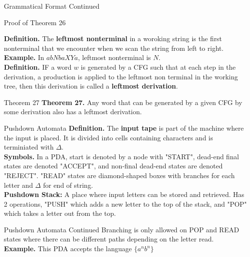 \documentclass{article}
\begin{document}
\begin{multicols*}{3}
\begin{blackbox}{Grammatical Format Continued}
\begin{bluebox}{Proof of Theorem 26}
\begin{itemize}[leftmargin=5pt]
        \end{itemize}
    \end{bluebox}
    \textbf{Definition.} The \textbf{leftmost nonterminal} in a woroking string is the first nonterminal that we encounter when we scan the string from left to right.\\
    \textbf{Example.} In $abNbaXYa$, leftmost nonterminal is $N$. \\
    \textbf{Definition.} IF a word $w$ is generated by a CFG such that at each step in the derivation, a production is applied to the leftmost non terminal in the working tree, then this derivation is called a \textbf{leftmost derivation}.\\
    \begin{redbox}{Theorem 27}
        \textbf{Theorem 27.} Any word that can be generated by a given CFG by some derivation also has a leftmost derivation.
    \end{redbox}

\end{blackbox}
\begin{blackbox}{Pushdown Automata}
    \textbf{Definition.} The \textbf{input tape} is part of the machine where the input is placed. It is divided into cells containing characters and is terminiated with $\Delta$.\\[1ex]
    \textbf{Symbols.} In a PDA, start is denoted by a node with "START", dead-end final states are denoted "ACCEPT", and non-final dead-end states are denoted "REJECT". "READ" states are diamond-shaped boxes with branches for each letter and $\Delta$ for end of string.\\[1ex]
    \textbf{Pushdown Stack:} A place where input letters can be stored and retrieved. Has 2 operations, "PUSH" which adds a new letter to the top of the stack, and "POP" which takes a letter out from the top.
\end{blackbox}
\begin{blackbox}{Pushdown Automata Continued}
    Branching is only allowed on POP and READ states where there can be different paths depending on the letter read.\\
    \textbf{Example.} This PDA accepts the language $\{a^nb^n\}$
    \begin{center}
        

\end{center}
\end{blackbox}
\end{multicols*}
\end{document}
